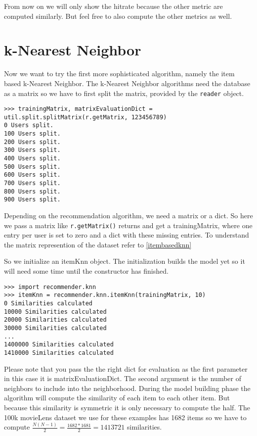 From now on we will only show the hitrate because the other metric are computed
similarly. But feel free to also compute the other metrics as well.

\section{k-Nearest Neighbor}
Now we want to try the first more sophisticated algorithm, namely the item based
k-Nearest Neighbor. The k-Nearest Neighbor algorithms need the database as a matrix so we have to
first split the matrix, provided by the \lstinline!reader! object.
\begin{lstlisting}[style=python]
>>> trainingMatrix, matrixEvaluationDict = util.split.splitMatrix(r.getMatrix, 123456789)
0 Users split.
100 Users split.
200 Users split.
300 Users split.
400 Users split.
500 Users split.
600 Users split.
700 Users split.
800 Users split.
900 Users split.
\end{lstlisting}
Depending on the recommendation algorithm, we need a matrix or a dict.
So here we pass a matrix like \lstinline!r.getMatrix()! returns and get a trainingMatrix, where one
entry per user is set to zero and a dict with these missing entries.
To understand the matrix represention of the dataset refer to \ref{itembasedknn}

So we initialize an itemKnn object. The initialization builds the model yet
so it will need some time until the constructor has finished.
\begin{lstlisting}[style=python]
>>> import recommender.knn
>>> itemKnn = recommender.knn.itemKnn(trainingMatrix, 10)
0 Similarities calculated
10000 Similarities calculated
20000 Similarities calculated
30000 Similarities calculated
...
1400000 Similarities calculated
1410000 Similarities calculated
\end{lstlisting}
Please note that you pass the the right dict for evaluation as the first parameter
in this case it is matrixEvaluationDict.
The second argument is the number of neighbors to include into the neighborhood.
During the model building phase the algorithm will compute the similarity of each
item to each other item. But because this similarity is symmetric it is only
necessary to compute the half. The 100k movieLens dataset we use for these examples
has 1682 items so we have to compute \begin{math} \frac{N(N-1)}{2}=\frac{1682*1681}{2} = 1413721 \end{math} 
similarities.

